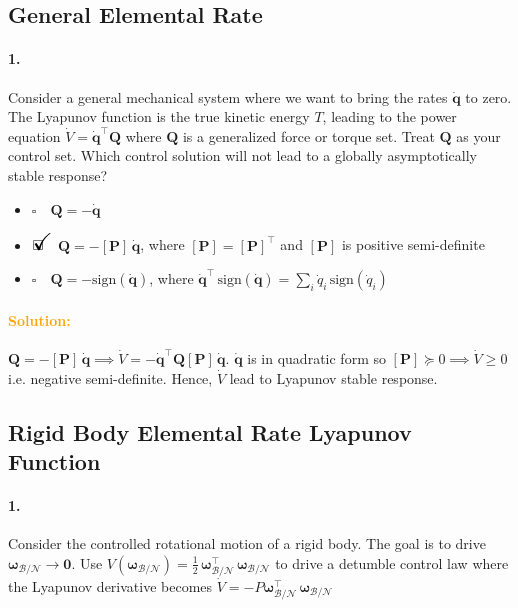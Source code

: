 \documentclass[12pt, a4paper]{article}
\newcommand{\ans}{\item[]$\rlap{\LARGE{\checkmark}}\square\quad$}
\newcommand{\noans}{\item[]$\square\quad$}
\begin{document}
\newpage
\subsection{General Elemental Rate}
\paragraph{1.}
Consider a general mechanical system where we want to bring the rates $\dot{\bm{q}}$ to zero. The Lyapunov function is the true kinetic energy $T$, leading to the power equation $\dot{V} = \dot{\bm{q}}^{\intercal}\bm{Q}$ where $\bm{Q}$ is a generalized force or torque set. Treat $\bm{Q}$ as your control set. Which control solution will not lead to a globally asymptotically stable response?

\begin{itemize}
    \noans $\bm{Q} = -\dot{\bm{q}}$
    \ans $\bm{Q} = -[\bm{P}]\, \dot{\bm{q}}$, \! where $[\bm{P}]=[\bm{P}]^{\intercal}$ and $[\bm{P}]$ is positive semi-definite
    \noans $\bm{Q} = -\text{sign}(\dot{\bm{q}})$, \! where $\dot{\bm{q}}^{\intercal} \, \text{sign}(\dot{\bm{q}}) = \sum_{i} \dot{q}_{i} \, \text{sign}(\dot{q}_{i})$
\end{itemize}

\paragraph{\textcolor{orange}{Solution:}}$\bm{Q}=-[\bm{P}]\,\dot{\bm{q}}\implies\dot{V}=-\dot{\bm{q}}^{\intercal}\bm{Q}[\bm{P}]\,\dot{\bm{q}}$. $\dot{\bm{q}}$ is in quadratic form so $[\bm{P}]\succeq0\implies\dot{V}\geq0$ i.e. negative semi-definite. Hence, $\dot{V}$ lead to Lyapunov stable response.

\newpage
\subsection{Rigid Body Elemental Rate Lyapunov Function}
\paragraph{1.}
Consider the controlled rotational motion of a rigid body. The goal is to drive $\bm{\omega}_{\mathcal{B}/\mathcal{N}} \rightarrow \bm{0}$. Use $V(\bm{\omega}_{\mathcal{B}/\mathcal{N}}) = \frac{1}{2}\, \bm{\omega}^{\intercal}_{\mathcal{B}/\mathcal{N}} \, \bm{\omega}_{\mathcal{B}/\mathcal{N}}$ to drive a detumble control law where the Lyapunov derivative becomes $\dot{V} = -P \bm{\omega}^{\intercal}_{\mathcal{B}/\mathcal{N}} \, \bm{\omega}_{\mathcal{B}/\mathcal{N}}$
\end{document}
